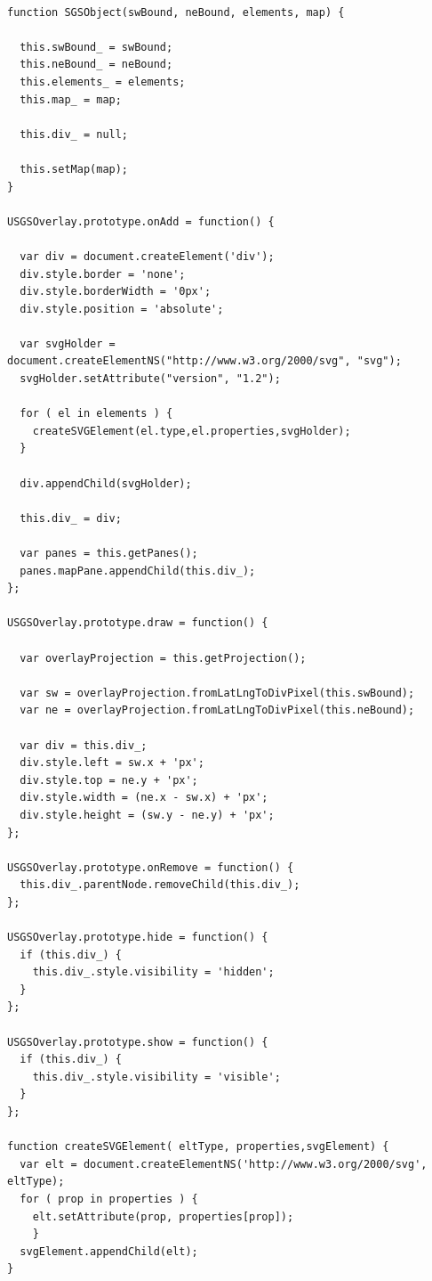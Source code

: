 \lstset{language=JavaScript}
\begin{lstlisting}[label={lst:svgImpl},caption={Klasa do obsługi SVG}]

function SGSObject(swBound, neBound, elements, map) {

  this.swBound_ = swBound;
  this.neBound_ = neBound;
  this.elements_ = elements;
  this.map_ = map;

  this.div_ = null;

  this.setMap(map);
}

USGSOverlay.prototype.onAdd = function() {

  var div = document.createElement('div');
  div.style.border = 'none';
  div.style.borderWidth = '0px';
  div.style.position = 'absolute';

  var svgHolder = document.createElementNS("http://www.w3.org/2000/svg", "svg");
  svgHolder.setAttribute("version", "1.2");

  for ( el in elements ) {
	createSVGElement(el.type,el.properties,svgHolder);
  }

  div.appendChild(svgHolder);

  this.div_ = div;

  var panes = this.getPanes();
  panes.mapPane.appendChild(this.div_);
};

USGSOverlay.prototype.draw = function() {

  var overlayProjection = this.getProjection();

  var sw = overlayProjection.fromLatLngToDivPixel(this.swBound);
  var ne = overlayProjection.fromLatLngToDivPixel(this.neBound);

  var div = this.div_;
  div.style.left = sw.x + 'px';
  div.style.top = ne.y + 'px';
  div.style.width = (ne.x - sw.x) + 'px';
  div.style.height = (sw.y - ne.y) + 'px';
};

USGSOverlay.prototype.onRemove = function() {
  this.div_.parentNode.removeChild(this.div_);
};

USGSOverlay.prototype.hide = function() {
  if (this.div_) {
    this.div_.style.visibility = 'hidden';
  }
};

USGSOverlay.prototype.show = function() {
  if (this.div_) {
    this.div_.style.visibility = 'visible';
  }
};

function createSVGElement( eltType, properties,svgElement) {
  var elt = document.createElementNS('http://www.w3.org/2000/svg', eltType);
  for ( prop in properties ) {
    elt.setAttribute(prop, properties[prop]);
    }
  svgElement.appendChild(elt);
}

\end{lstlisting}

